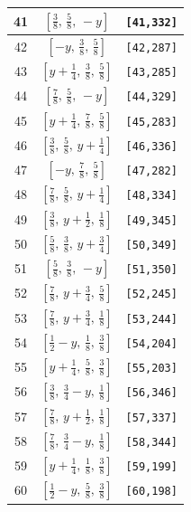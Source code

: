 \documentclass[fleqn,8pt]{jsarticle}
\begin{document}
\begin{longtable}{ccc}
41 & $\left[ \frac{3}{8},\, \frac{5}{8},\, - y \right]$ & {\tt [41,332]} \\ \hline
42 & $\left[ - y,\, \frac{3}{8},\, \frac{5}{8} \right]$ & {\tt [42,287]} \\ \hline
43 & $\left[ y + \frac{1}{4},\, \frac{3}{8},\, \frac{5}{8} \right]$ & {\tt [43,285]} \\ \hline
44 & $\left[ \frac{7}{8},\, \frac{5}{8},\, - y \right]$ & {\tt [44,329]} \\ \hline
45 & $\left[ y + \frac{1}{4},\, \frac{7}{8},\, \frac{5}{8} \right]$ & {\tt [45,283]} \\ \hline
46 & $\left[ \frac{3}{8},\, \frac{5}{8},\, y + \frac{1}{4} \right]$ & {\tt [46,336]} \\ \hline
47 & $\left[ - y,\, \frac{7}{8},\, \frac{5}{8} \right]$ & {\tt [47,282]} \\ \hline
48 & $\left[ \frac{7}{8},\, \frac{5}{8},\, y + \frac{1}{4} \right]$ & {\tt [48,334]} \\ \hline
49 & $\left[ \frac{3}{8},\, y + \frac{1}{2},\, \frac{1}{8} \right]$ & {\tt [49,345]} \\ \hline
50 & $\left[ \frac{5}{8},\, \frac{3}{8},\, y + \frac{3}{4} \right]$ & {\tt [50,349]} \\ \hline
51 & $\left[ \frac{5}{8},\, \frac{3}{8},\, - y \right]$ & {\tt [51,350]} \\ \hline
52 & $\left[ \frac{7}{8},\, y + \frac{3}{4},\, \frac{5}{8} \right]$ & {\tt [52,245]} \\ \hline
53 & $\left[ \frac{7}{8},\, y + \frac{3}{4},\, \frac{1}{8} \right]$ & {\tt [53,244]} \\ \hline
54 & $\left[ \frac{1}{2} - y,\, \frac{1}{8},\, \frac{3}{8} \right]$ & {\tt [54,204]} \\ \hline
55 & $\left[ y + \frac{1}{4},\, \frac{5}{8},\, \frac{3}{8} \right]$ & {\tt [55,203]} \\ \hline
56 & $\left[ \frac{3}{8},\, \frac{3}{4} - y,\, \frac{1}{8} \right]$ & {\tt [56,346]} \\ \hline
57 & $\left[ \frac{7}{8},\, y + \frac{1}{2},\, \frac{1}{8} \right]$ & {\tt [57,337]} \\ \hline
58 & $\left[ \frac{7}{8},\, \frac{3}{4} - y,\, \frac{1}{8} \right]$ & {\tt [58,344]} \\ \hline
59 & $\left[ y + \frac{1}{4},\, \frac{1}{8},\, \frac{3}{8} \right]$ & {\tt [59,199]} \\ \hline
60 & $\left[ \frac{1}{2} - y,\, \frac{5}{8},\, \frac{3}{8} \right]$ & {\tt [60,198]} \\ \hline

\end{longtable}
\end{document}
